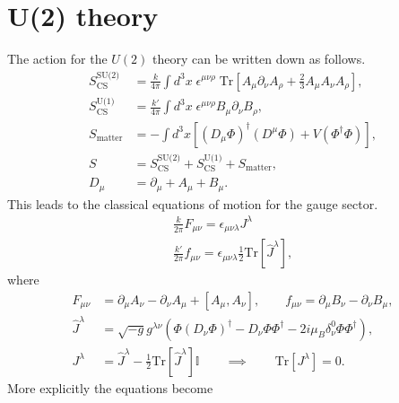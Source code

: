 \section{U(2) theory}

The action for the $U(2)$ theory can be written down as follows.
\begin{align}
    S^{\text{SU(2)}}_{\text{CS}} &= \frac{k}{4 \pi} \int d^3x \; \epsilon^{\mu \nu \rho} \; \mathrm{Tr} \left[A_{\mu} \partial_{\nu}A_{\rho}+ \frac{2}{3} A_{\mu} A_{\nu}A_{\rho} \right], \\
    S^{\text{U(1)}}_{\text{CS}} &= \frac{k'}{4 \pi} \int d^3x \; \epsilon^{\mu \nu \rho} B_{\mu} \partial_{\nu} B_{\rho},\\
    S_{\text{matter}}&= - \int d^3x \left[ \left(D_{\mu} \Phi \right)^{\dag} \left(D^{\mu} \Phi \right) + V\left(\Phi^{\dag}\Phi \right)\right], \\
    S &= S^{\text{SU(2)}}_{\text{CS}} + S^{\text{U(1)}}_{\text{CS}} + S_{\text{matter}}, \\
    D_{\mu} &= \partial_{\mu} + A_{\mu}+B_{\mu}.
\end{align}
This leads to the classical equations of motion for the gauge sector.
\begin{align}
    \frac{k}{2 \pi} F_{\mu \nu} = \epsilon_{\mu \nu \lambda} J^{\lambda}\\
    \frac{k'}{2\pi} f_{\mu \nu} = \epsilon_{\mu \nu \lambda} \frac{1}{2} \mathrm{Tr} \left[\hat{J}^{\lambda} \right],
\end{align}
where
\begin{align}
    F_{\mu \nu}&= \partial_{\mu} A_{\nu} - \partial_{\nu}A_{\mu} + [A_{\mu}, A_{\nu}], \qquad f_{\mu \nu} = \partial_{\mu} B_{\nu} - \partial_{\nu} B_{\mu}, \\
    \hat{J}^{\lambda} &= \sqrt{-g} g^{\lambda \nu} \left( \Phi \left( D_{\nu} \Phi\right)^{\dag} - D_{\nu} \Phi \Phi^{\dag}   -2i \mu_B \delta^0_{\nu} \Phi \Phi^{\dag}  \right), \\
    J^{\lambda} &= \hat{J}^{\lambda} - \frac{1}{2}\mathrm{Tr}\left[\hat{J}^{\lambda} \right]\mathbb{I} \qquad \implies \qquad \mathrm{Tr}\left[J^{\lambda}\right]=0.
\end{align}
More explicitly the equations become
